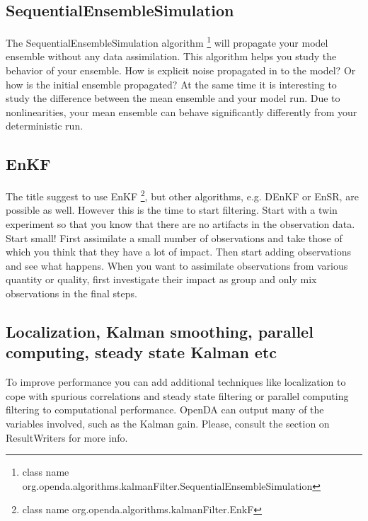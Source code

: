 \subsection{SequentialEnsembleSimulation}\label{Sec:SequentialEnsembleSimulation}
The SequentialEnsembleSimulation algorithm \footnote{class name org.openda.algorithms.kalmanFilter.SequentialEnsembleSimulation} will propagate your model ensemble without any data assimilation. This algorithm helps you study the behavior of your ensemble. How is explicit noise propagated in to the model? Or how is the initial ensemble propagated? At the same time it is interesting to study the difference between the mean ensemble and your model run. Due to nonlinearities, your mean ensemble can behave significantly differently from your deterministic run.

\subsection{EnKF}
The title suggest to use EnKF  \footnote{class name org.openda.algorithms.kalmanFilter.EnkF}, but other algorithms, e.g. DEnKF or EnSR, are possible as well. However this is the time to start filtering. Start with a twin experiment so that you know that there are no artifacts in the observation data. Start small! First assimilate a small number of observations and take those of which you think that they have a lot of impact. Then start adding observations and see what happens. When you want to assimilate observations from various quantity or quality, first investigate their impact as group and only mix observations in the final steps.

\subsection{Localization, Kalman smoothing, parallel computing, steady state Kalman etc}
To improve performance you can add additional techniques like localization to cope with spurious correlations and steady state filtering or parallel computing filtering to computational performance. OpenDA can output many of the variables involved, such as the Kalman gain. Please, consult the section on ResultWriters for more info.


